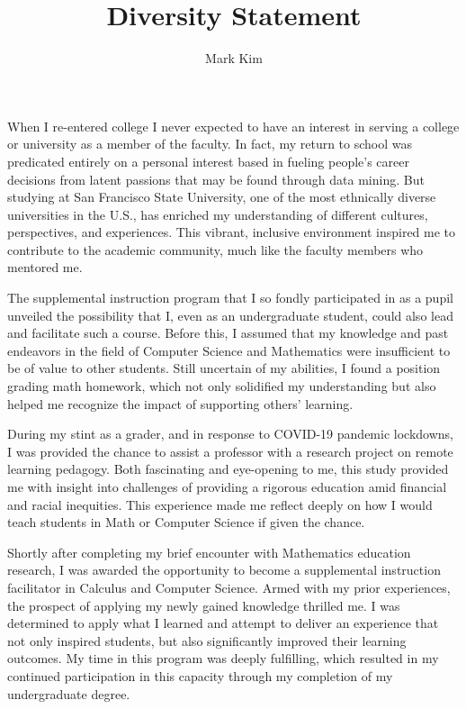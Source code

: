 \documentclass[12pt]{article}
\title{Diversity Statement}
\author{Mark Kim}
\begin{document}
\maketitle

When I re-entered college I never expected to have an interest in serving a college or university as a member of the faculty.  In fact, my
return to school was predicated entirely on a personal interest based in fueling people's career decisions from latent
passions that may be found through data mining.  But studying at San Francisco State University, one of the most ethnically
diverse universities in the U.S., has enriched my understanding of different cultures, perspectives, and experiences. This vibrant,
inclusive environment inspired me to contribute to the academic community, much like the faculty members who mentored me.

The supplemental instruction program that I so fondly participated in as a pupil unveiled the possibility that I, even as an undergraduate
student, could also lead and facilitate such a course.  Before this, I assumed that my knowledge and past endeavors in the field of Computer
Science and Mathematics were insufficient to be of value to other students.  Still uncertain of my abilities, I found a position grading
math homework, which not only solidified my understanding but also helped me recognize the impact of supporting others' learning.

During my stint as a grader, and in response to COVID-19 pandemic lockdowns, I was provided the chance to assist a professor with a research
project on remote learning pedagogy.  Both fascinating and eye-opening 
to me, this study provided me with insight into challenges of providing a rigorous education amid financial and racial inequities.  This
experience made me reflect deeply on how I would teach students in Math or Computer Science if given the chance.

Shortly after completing my brief encounter with Mathematics education research,
I was awarded the opportunity to become a supplemental instruction facilitator
in Calculus and Computer Science.  Armed with my prior experiences, the prospect of applying my newly
gained knowledge thrilled me.  I was determined to apply what I learned and attempt to
deliver an experience that not only inspired students, but also significantly
improved their learning outcomes.  My time in this program was deeply fulfilling, which
resulted in my continued participation in this capacity through my completion of
my undergraduate degree.
\end{document}
